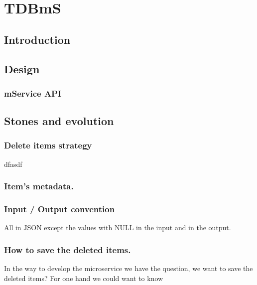 \documentclass[oneside,english,titlepage]{scrbook}
\begin{document}
\bigskip




\section{TDBmS}

\subsection{Introduction}



\subsection{Design}





\subsubsection{mService API}

\subsection{Stones and evolution}


\subsubsection{Delete items strategy}

dfasdf

\subsubsection{Item's metadata.}

\subsubsection{Input / Output convention}

All in JSON except the values with NULL in the input and in the output.

\subsubsection{How to save the deleted items.}

In the way to develop the microservice we have the question, we want
to save the deleted items? For one hand we could want to know
\end{document}
